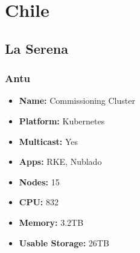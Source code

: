 \section{Chile}
\subsection{La Serena}
\subsubsection{Antu}
\begin{itemize}
  \itemsep0em 
  \item \textbf{Name:}      Commissioning Cluster
  \item \textbf{Platform:}  Kubernetes
  \item \textbf{Multicast:} Yes
  \item \textbf{Apps:}      RKE, Nublado
  \item \textbf{Nodes:}     15
  \item \textbf{CPU:}       832
  \item \textbf{Memory:}    3.2TB
  \item \textbf{Usable Storage:}   26TB
\end{itemize}
\vspace*{0.1mm}
